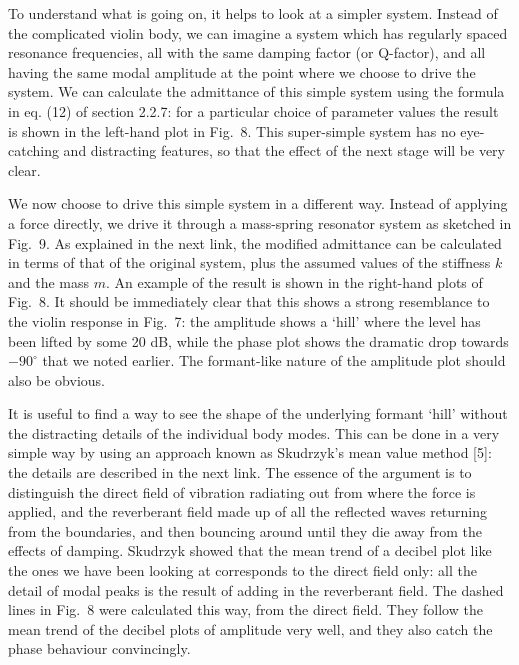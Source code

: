 
  To understand what is going on, it helps to look at a simpler system. Instead 
  of the complicated violin body, we can imagine a system which has regularly 
  spaced resonance frequencies, all with the same damping factor (or Q-factor), 
  and all having the same modal amplitude at the point where we choose to drive 
  the system. We can calculate the admittance of this simple system using the 
  formula in eq. (12) of section 2.2.7: for a particular choice of parameter 
  values the result is shown in the left-hand plot in Fig.\ 8. This 
  super-simple system has no eye-catching and distracting features, so that the 
  effect of the next stage will be very clear. 



  We now choose to drive this simple system in a different way. Instead of 
  applying a force directly, we drive it through a mass-spring resonator system 
  as sketched in Fig.\ 9. As explained in the next link, the modified 
  admittance can be calculated in terms of that of the original system, plus 
  the assumed values of the stiffness $k$ and the mass $m$. An example of the 
  result is shown in the right-hand plots of Fig.\ 8. It should be immediately 
  clear that this shows a strong resemblance to the violin response in Fig.\ 7: 
  the amplitude shows a `hill' where the level has been lifted by some 20 dB, 
  while the phase plot shows the dramatic drop towards $-90^\circ$ that we 
  noted earlier. The formant-like nature of the amplitude plot should also be 
  obvious. 


  It is useful to find a way to see the shape of the underlying formant `hill' 
  without the distracting details of the individual body modes. This can be 
  done in a very simple way by using an approach known as Skudrzyk’s mean value 
  method [5]: the details are described in the next link. The essence of the 
  argument is to distinguish the direct field of vibration radiating out from 
  where the force is applied, and the reverberant field made up of all the 
  reflected waves returning from the boundaries, and then bouncing around until 
  they die away from the effects of damping. Skudrzyk showed that the mean 
  trend of a decibel plot like the ones we have been looking at corresponds to 
  the direct field only: all the detail of modal peaks is the result of adding 
  in the reverberant field. The dashed lines in Fig.\ 8 were calculated this 
  way, from the direct field. They follow the mean trend of the decibel plots 
  of amplitude very well, and they also catch the phase behaviour convincingly. 

